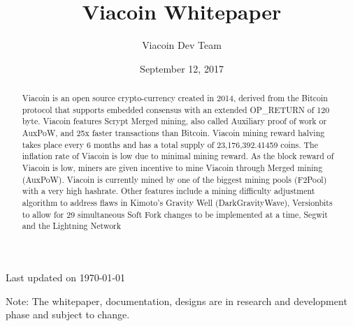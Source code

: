 \documentclass{article}
\author{Viacoin Dev Team}
\title{Viacoin Whitepaper}
\date{September 12, 2017}
\begin{document}
\maketitle

{\normalfont
      Last updated on \today}

\begin{abstract}\noindent
\normalsize Viacoin is an open source crypto-currency created in 2014,
derived from the \cite{bitcoin2008}Bitcoin protocol that supports embedded consensus with an
extended OP\_RETURN of 120 byte. Viacoin features Scrypt Merged mining,
also called Auxiliary proof of work or AuxPoW, and 25x faster transactions than Bitcoin.
Viacoin mining reward halving takes place every 6 months and has a total supply of
23,176,392.41459 coins. The inflation rate of Viacoin is low due to minimal mining reward. As the block
reward of Viacoin is low, miners are given incentive to mine Viacoin through Merged mining (AuxPoW).
Viacoin is currently mined by one of the biggest mining pools
(F2Pool) with a very high hashrate.
\linebreak
\noindent Other features include a mining difficulty adjustment algorithm to address flaws in Kimoto’s Gravity Well (DarkGravityWave),
Versionbits to allow for 29 simultaneous Soft Fork changes to be implemented at a time, Segwit and the Lightning Network
\end{abstract}


\vfill \noindent
\small Note: The whitepaper, documentation, designs are in research and development phase and subject to change.
\newpage

\normalsize
\end{document}
